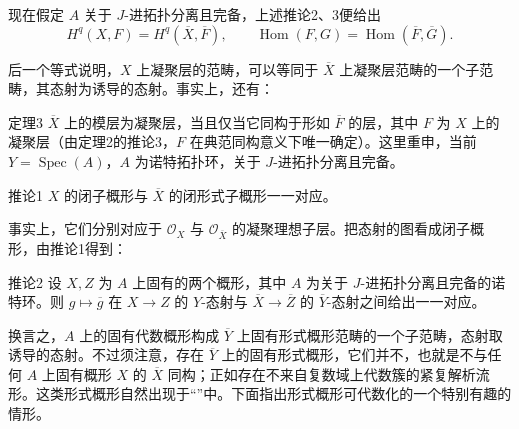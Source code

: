 现在假定 $A$ 关于 $J$-进拓扑分离且完备，上述推论2、3便给出
\[
H^q(X,F)=H^q(\overline X,\overline F),\qquad
\operatorname{Hom}(F,G)=\operatorname{Hom}(\overline F,\overline G).
\]

后一个等式说明，$X$ 上凝聚层的范畴，可以等同于 $\overline X$ 上凝聚层范畴的一个子范畴，其态射为诱导的态射。事实上，还有：
\begin{statement}{定理3}
$\overline X$ 上的模层为凝聚层，当且仅当它同构于形如 $\overline F$ 的层，其中 $F$ 为 $X$ 上的凝聚层（由定理2的推论3，$F$ 在典范同构意义下唯一确定）。这里重申，当前 $Y=\operatorname{Spec}(A)$，$A$ 为诺特拓扑环，关于 $J$-进拓扑分离且完备。
\end{statement}
\begin{statement}{推论1}
$X$ 的闭子概形与 $\overline X$ 的闭形式子概形一一对应。
\end{statement}
事实上，它们分别对应于 $\mathcal O_X$ 与 $\mathcal O_{\overline X}$ 的凝聚理想子层。把态射的图看成闭子概形，由推论1得到：
\begin{statement}{推论2}
设 $X,Z$ 为 $A$ 上固有的两个概形，其中 $A$ 为关于 $J$-进拓扑分离且完备的诺特环。则 $g\mapsto\overline g$ 在 $X\to Z$ 的 $Y$-态射与 $\overline X\to\overline Z$ 的 $\overline Y$-态射之间给出一一对应。
\end{statement}
换言之，$A$ 上的固有代数概形构成 $\overline Y$ 上固有形式概形范畴的一个子范畴，态射取诱导的态射。不过须注意，存在 $\overline Y$ 上的固有形式概形，它们并不，也就是不与任何 $A$ 上固有概形 $X$ 的 $\overline X$ 同构；正如存在不来自复数域上代数簇的紧复解析流形。这类形式概形自然出现于“”中。下面指出形式概形可代数化的一个特别有趣的情形。

